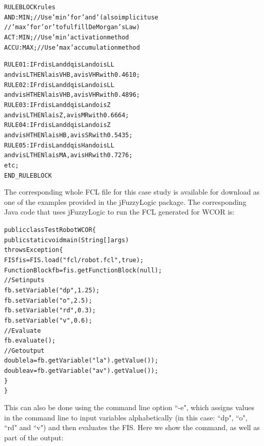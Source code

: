 \documentclass[11pt,twoside]{article}
\begin{document}
\begin{multicols}{2}
\vspace*{4pt}
\begin{scriptsize}
\begin{alltt}
RULEBLOCK rules
AND  : MIN;			// Use 'min' for 'and' (also implicit use 
            //'max' for 'or' to fulfill DeMorgan's Law)
ACT  : MIN;			// Use 'min' activation method
ACCU : MAX;			// Use 'max' accumulation method

RULE 01: IF rd is  L and dq is L and o is LL 
    and v is L THEN la is VHB , av is VHR with 0.4610;
RULE 02: IF rd is  L and dq is L and o is LL 
    and v is H THEN la is VHB , av is VHR with 0.4896;
RULE 03: IF rd is  L and dq is L and o is  Z 
    and v is L THEN la is   Z , av is  MR with 0.6664;
RULE 04: IF rd is  L and dq is L and o is  Z 
    and v is H THEN la is  HB , av is  SR with 0.5435;
RULE 05: IF rd is  L and dq is H and o is LL 
    and v is L THEN la is  MA , av is  HR with 0.7276;
etc;
END\_RULEBLOCK
\end{alltt}
\end{scriptsize}
\vspace*{4pt}

The corresponding whole FCL file for this case study is available for download as one of the examples provided in the jFuzzyLogic package. The corresponding Java code that uses jFuzzyLogic to run the FCL generated for WCOR is:

\vspace*{4pt}
\begin{scriptsize}
\begin{alltt}
public class TestRobotWCOR \{
  public static void main(String[] args) 
  throws Exception \{
    FIS fis = FIS.load("fcl/robot.fcl", true);
    FunctionBlock fb = fis.getFunctionBlock(null);
    // Set inputs
    fb.setVariable("dp", 1.25);
    fb.setVariable("o", 2.5); 
    fb.setVariable("rd", 0.3); 
    fb.setVariable("v", 0.6);
    // Evaluate
    fb.evaluate(); 
    // Get output
    double la = fb.getVariable("la").getValue());
    double av = fb.getVariable("av").getValue());
  \}
\}
\end{alltt}
\end{scriptsize}

This can also be done using the command line option ``-e", which assigns values in the command line to input variables alphabetically (in this case: ``dp", ``o", ``rd" and ``v") and then evaluates the FIS. Here we show the command, as well as part of the output:


\end{multicols}
\end{document}
